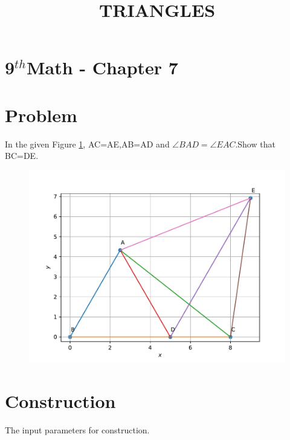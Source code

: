 \documentclass[10pt]{article}
\begin{document}
\begin{center}
\title{\textbf{TRIANGLES}}
\date{\vspace{-5ex}}
\maketitle
\end{center}
\section*{9$^{th}$Math - Chapter 7}
\section*{Problem}
In the given Figure \ref{fig:1}, AC=AE,AB=AD and $\angle BAD=\angle EAC$.Show that BC=DE.
\begin{figure}[!h]
	\begin{center}
	\includegraphics[width=\columnwidth]{./fig/fig.pdf}
	\end{center}
\caption{}
\label{fig:1}
\end{figure}
\section*{Construction}
The input parameters for construction.\\
\end{document}
